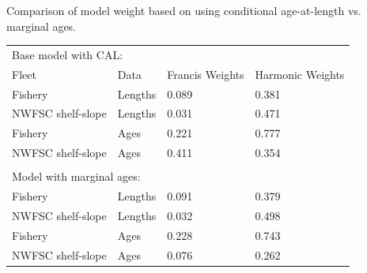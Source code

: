 \documentclass[pdf]{beamer}\usepackage[]{graphicx}\usepackage[]{color}
\begin{document}
\begin{frame}{Comparison of model weight based on using conditional age-at-length vs. marginal ages.} %
  \begin{table}[ht]
  \centering
  \begin{tabular}{p{1.25in}p{0.75in}p{0.8in}p{0.8in}}
  \multicolumn{4}{l}{Base model with CAL:}\\
  Fleet & Data & Francis Weights &  Harmonic Weights \\ 
  \hline
  Fishery & Lengths &  0.089 &  0.381\\ 
  NWFSC shelf-slope & Lengths & 0.031 & 0.471 \\
  Fishery & Ages & 0.221 & 0.777\\
  NWFSC shelf-slope & Ages & 0.411 & 0.354 \\
  \multicolumn{4}{l}{}\\
  \multicolumn{4}{l}{Model with marginal ages:}\\
  \hline
  Fishery & Lengths &  0.091 & 0.379\\ 
  NWFSC shelf-slope & Lengths & 0.032 &  0.498\\
  Fishery & Ages & 0.228 & 0.743\\
  NWFSC shelf-slope & Ages & 0.076 & 0.262 \\
  \hline
  \end{tabular}
  \end{table}
\end{frame}
\end{document}
